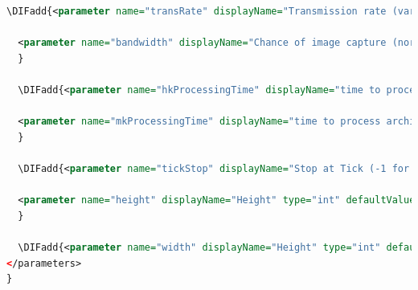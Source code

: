 \begin{appendices}
\begin{lstlisting}[language=XML, caption={Example params.xml file for a Repast simulation}]
  \DIFadd{<parameter name="transRate" displayName="Transmission rate (variable or ideal)" type="java.lang.String" defaultValue="variable" isReadOnly="false" converter="repast.simphony.parameter.StringConverterFactory$StringStringConverter" />

  <parameter name="bandwidth" displayName="Chance of image capture (normal or saturated)" type="java.lang.String" defaultValue="normal" isReadOnly="false" converter="repast.simphony.parameter.StringConverterFactory$StringStringConverter" />
  }

  \DIFadd{<parameter name="hkProcessingTime" displayName="time to process archive" type="int" defaultValue="43" isReadOnly="false" converter="repast.simphony.parameter.StringConverterFactory$IntConverter"/>

  <parameter name="mkProcessingTime" displayName="time to process archive" type="int" defaultValue="5" isReadOnly="false" converter="repast.simphony.parameter.StringConverterFactory$IntConverter"/>
  }

  \DIFadd{<parameter name="tickStop" displayName="Stop at Tick (-1 for No)" type="int" defaultValue="15552000" isReadOnly="false" converter="repast.simphony.parameter.StringConverterFactory$IntConverter"/>

  <parameter name="height" displayName="Height" type="int" defaultValue="1200" isReadOnly="false" converter="repast.simphony.parameter.StringConverterFactory$IntConverter" />
  }

  \DIFadd{<parameter name="width" displayName="Height" type="int" defaultValue="1200" isReadOnly="false" converter="repast.simphony.parameter.StringConverterFactory$IntConverter" />
</parameters>
}\end{lstlisting}

\DIFaddend \end{appendices}